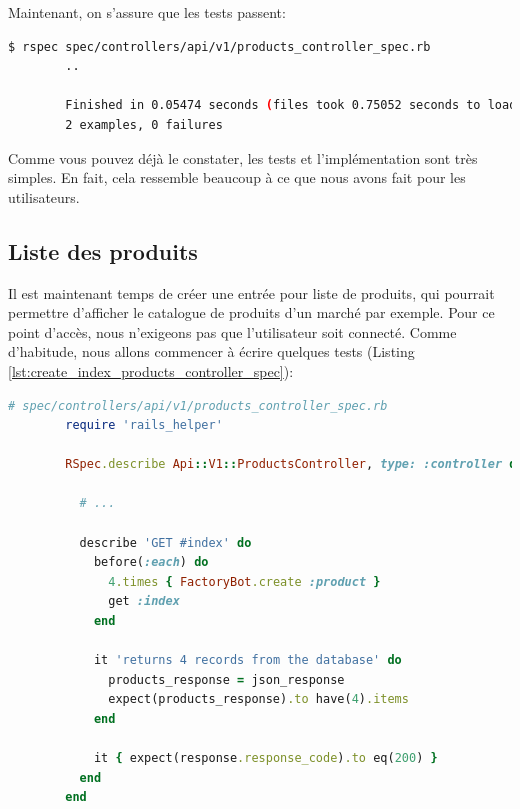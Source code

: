 \documentclass[]{report}
\begin{document}
      Maintenant, on s'assure que les tests passent:

      \begin{scriptsize}
        \begin{lstlisting}[language=bash]
        $ rspec spec/controllers/api/v1/products_controller_spec.rb
        ..

        Finished in 0.05474 seconds (files took 0.75052 seconds to load)
        2 examples, 0 failures
        \end{lstlisting}
      \end{scriptsize}

      Comme vous pouvez déjà le constater, les tests et l'implémentation sont très simples. En fait, cela ressemble beaucoup à ce que nous avons fait pour les utilisateurs.

    \subsection{Liste des produits}

      Il est maintenant temps de créer une entrée pour liste de produits, qui pourrait permettre d'afficher le catalogue de produits d'un marché par exemple. Pour ce point d'accès, nous n'exigeons pas que l'utilisateur soit connecté. Comme d'habitude, nous allons commencer à écrire quelques tests (Listing \ref{lst:create_index_products_controller_spec}):

      \begin{scriptsize}
        \begin{lstlisting}[language=ruby, caption={Test de l'affichage des produits}, label={lst:create_index_products_controller_spec}]
        # spec/controllers/api/v1/products_controller_spec.rb
        require 'rails_helper'

        RSpec.describe Api::V1::ProductsController, type: :controller do

          # ...

          describe 'GET #index' do
            before(:each) do
              4.times { FactoryBot.create :product }
              get :index
            end

            it 'returns 4 records from the database' do
              products_response = json_response
              expect(products_response).to have(4).items
            end

            it { expect(response.response_code).to eq(200) }
          end
        end
        \end{lstlisting}
      \end{scriptsize}
\end{document}
